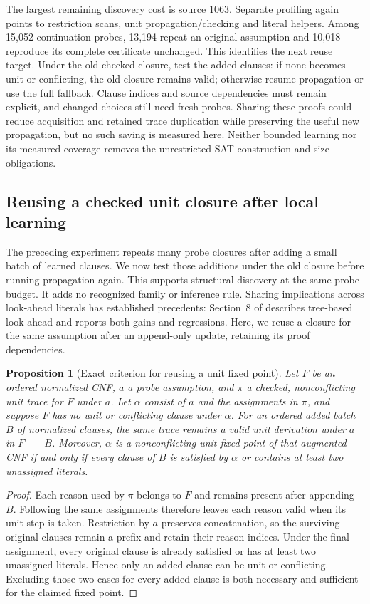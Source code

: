 \documentclass[11pt,a4paper]{article}
\numberwithin{equation}{section}
\theoremstyle{plain}
\newtheorem{proposition}[lemma]{Proposition}
\theoremstyle{definition}
\theoremstyle{remark}
\begin{document}
The largest remaining discovery cost is source 1063. Separate profiling again points to restriction scans, unit propagation/checking and literal helpers. Among 15,052 continuation probes, 13,194 repeat an original assumption and 10,018 reproduce its complete certificate unchanged. This identifies the next reuse target. Under the old checked closure, test the added clauses: if none becomes unit or conflicting, the old closure remains valid; otherwise resume propagation or use the full fallback. Clause indices and source dependencies must remain explicit, and changed choices still need fresh probes. Sharing these proofs could reduce acquisition and retained trace duplication while preserving the useful new propagation, but no such saving is measured here. Neither bounded learning nor its measured coverage removes the unrestricted-SAT construction and size obligations.

\subsection{Reusing a checked unit closure after local learning}
\label{sec:probe-closure-reuse}

The preceding experiment repeats many probe closures after adding a small batch of learned clauses. We now test those additions under the old closure before running propagation again. This supports structural discovery at the same probe budget. It adds no recognized family or inference rule. Sharing implications across look-ahead literals has established precedents: Section~8 of \citet{heule2005marcheq} describes tree-based look-ahead and reports both gains and regressions. Here, we reuse a closure for the same assumption after an append-only update, retaining its proof dependencies.

\begin{proposition}[Exact criterion for reusing a unit fixed point]
\label{prop:probe-closure-reuse}
Let $F$ be an ordered normalized CNF, $a$ a probe assumption, and $\pi$ a checked, nonconflicting unit trace for $F$ under $a$. Let $\alpha$ consist of $a$ and the assignments in $\pi$, and suppose $F$ has no unit or conflicting clause under $\alpha$. For an ordered added batch $B$ of normalized clauses, the same trace remains a valid unit derivation under $a$ in $F\mathbin{+\!+}B$. Moreover, $\alpha$ is a nonconflicting unit fixed point of that augmented CNF if and only if every clause of $B$ is satisfied by $\alpha$ or contains at least two unassigned literals.
\end{proposition}
\begin{proof}
Each reason used by $\pi$ belongs to $F$ and remains present after appending $B$. Following the same assignments therefore leaves each reason valid when its unit step is taken. Restriction by $a$ preserves concatenation, so the surviving original clauses remain a prefix and retain their reason indices. Under the final assignment, every original clause is already satisfied or has at least two unassigned literals. Hence only an added clause can be unit or conflicting. Excluding those two cases for every added clause is both necessary and sufficient for the claimed fixed point.
\end{proof}
\end{document}
